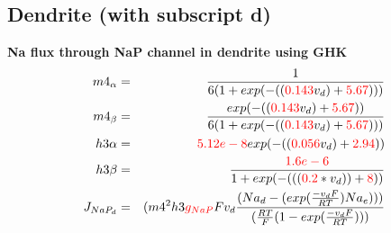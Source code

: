 \documentclass[fleqn]{report}
\numberwithin{equation}{section}
\numberwithin{equation}{section}
\begin{document}
	\subsection{Dendrite (with subscript d)}
	 \textbf{Na flux through NaP channel in dendrite using GHK}\\
	 
	\begin{eqnarray}
		            m4_{\alpha}    & = &\frac{1}{6  (1 + exp(-((\textcolor{red}{0.143}  v_d) + \textcolor{red}{5.67})))} \\
	                m4_{\beta}     &=& \frac{exp(-((\textcolor{red}{0.143} v_d) + \textcolor{red}{5.67}))}{6  (1 + exp(-((\textcolor{red}{0.143}  v_d) + \textcolor{red}{5.67})))}\\ 
	            h3{\alpha}     &=& \textcolor{red}{5.12e-8}  exp(-((\textcolor{red}{0.056}  v_d) + \textcolor{red}{2.94}))\\
	            h3{\beta}      &=& \frac{\textcolor{red}{1.6e-6}}{1 + exp(-(((\textcolor{red}{0.2} * v_d)) + \textcolor{red}{8}))}\\
	            J_{NaP_{d}}     &=& (m4^2  h3  \textcolor{red}{g_{NaP}} F v_d \frac{(Na_d - (exp(\frac{-v_d F}{RT})  Na_e)))}{(\frac{RT}{F} (1 - exp(\frac{-v_d F}{RT})))} \\
	\end{eqnarray}
\end{document}
